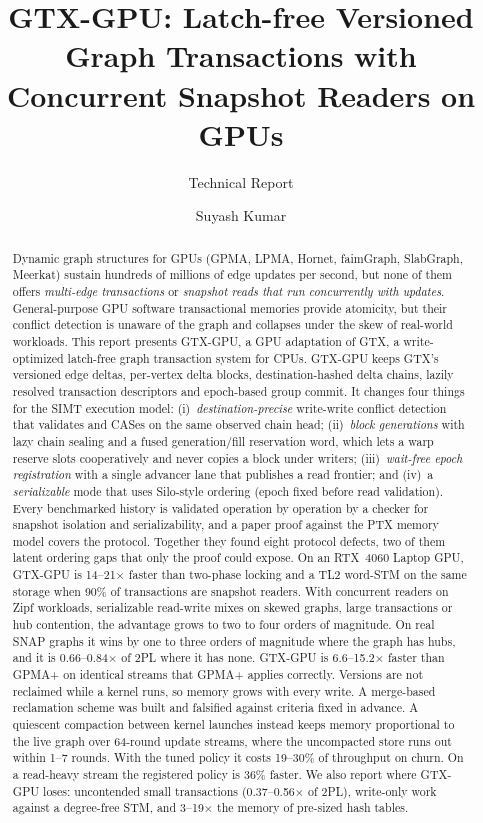 \documentclass[sigconf,nonacm]{acmart}
\newcommand{\sys}{GTX-GPU}
\begin{document}
\title{\sys{}: Latch-free Versioned Graph Transactions with Concurrent Snapshot Readers on GPUs}
\subtitle{Technical Report}

\author{Suyash Kumar}

\begin{abstract}
Dynamic graph structures for GPUs (GPMA, LPMA, Hornet, faimGraph, SlabGraph, Meerkat) sustain hundreds of millions of
edge updates per second, but none of them offers \emph{multi-edge transactions} or \emph{snapshot reads that run
concurrently with updates}. General-purpose GPU software transactional memories provide atomicity, but their conflict
detection is unaware of the graph and collapses under the skew of real-world workloads. This report presents
\sys{}, a GPU adaptation of GTX, a write-optimized latch-free graph transaction system for CPUs. \sys{} keeps GTX's
versioned edge deltas, per-vertex delta blocks, destination-hashed delta chains, lazily resolved transaction
descriptors and epoch-based group commit. It changes four things for the SIMT execution model:
(i)~\emph{destination-precise} write-write conflict detection that validates and CASes on the same observed chain head;
(ii)~\emph{block generations} with lazy chain sealing and a fused generation/fill reservation word, which lets a warp
reserve slots cooperatively and never copies a block under writers;
(iii)~\emph{wait-free epoch registration} with a single advancer lane that publishes a read frontier; and
(iv)~a \emph{serializable} mode that uses Silo-style ordering (epoch fixed before read validation).
Every benchmarked history is validated operation by operation by a checker for snapshot isolation and
serializability, and a paper proof against the PTX memory model covers the protocol. Together they found eight
protocol defects, two of them latent ordering gaps that only the proof could expose.
On an RTX~4060 Laptop GPU, \sys{} is 14--21$\times$ faster than two-phase locking and a TL2 word-STM on the same
storage when 90\% of transactions are snapshot readers. With concurrent readers on Zipf workloads, serializable
read-write mixes on skewed graphs, large transactions or hub contention, the advantage grows to two to four orders of
magnitude. On real SNAP graphs it wins by one to three orders of magnitude where the graph has hubs, and it is
0.66--0.84$\times$ of 2PL where it has none. \sys{} is 6.6--15.2$\times$ faster than GPMA+ on identical streams that
GPMA+ applies correctly. Versions are not reclaimed while a kernel runs, so memory grows with every write. A merge-based
reclamation scheme was built and falsified against criteria fixed in advance. A quiescent compaction between kernel
launches instead keeps memory proportional to the live graph over 64-round update streams, where the uncompacted store runs out
within 1--7 rounds. With the tuned policy it costs 19--30\% of throughput on churn. On a read-heavy stream the
registered policy is 36\% faster. We also report where \sys{} loses: uncontended small
transactions (0.37--0.56$\times$ of 2PL), write-only work against a degree-free STM, and 3--19$\times$ the memory of
pre-sized hash tables.
\end{abstract}
\end{document}
